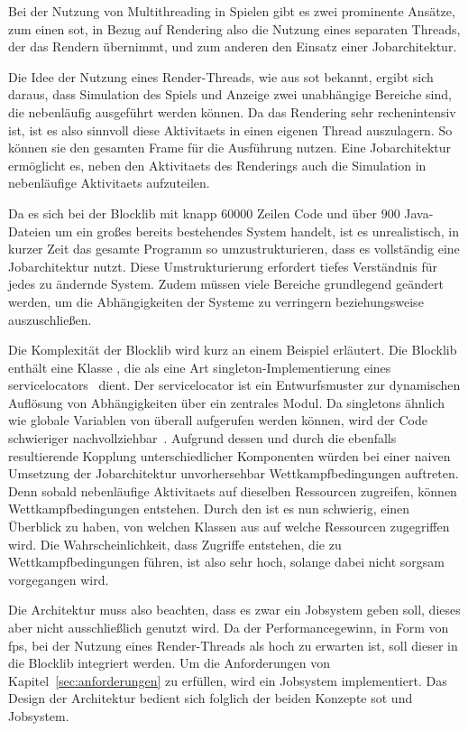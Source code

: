 Bei der Nutzung von Multithreading in Spielen gibt es zwei prominente Ansätze, zum einen \ac{sot}, in Bezug auf Rendering also die Nutzung eines separaten Threads, der das Rendern übernimmt, und zum anderen den Einsatz einer Jobarchitektur.

Die Idee der Nutzung eines Render-Threads, wie aus \ac{sot} bekannt, ergibt sich daraus, dass Simulation des Spiels und Anzeige zwei unabhängige Bereiche sind, die nebenläufig ausgeführt werden können. Da das Rendering sehr rechenintensiv ist, ist es also sinnvoll diese \glspl{Aktivitaet} in einen eigenen Thread auszulagern. So können sie den gesamten Frame für die Ausführung nutzen. Eine Jobarchitektur ermöglicht es, neben den \glspl{Aktivitaet} des Renderings auch die Simulation in nebenläufige \glspl{Aktivitaet} aufzuteilen. 

Da es sich bei der Blocklib mit knapp $60000$ Zeilen Code und über $900$ Java-Dateien um ein großes bereits bestehendes System handelt, ist es unrealistisch, in kurzer Zeit das gesamte \gls{Programm} so umzustrukturieren, dass es vollständig eine Jobarchitektur nutzt. Diese Umstrukturierung erfordert tiefes Verständnis für jedes zu ändernde System. Zudem müssen viele Bereiche grundlegend geändert werden, um die Abhängigkeiten der Systeme zu verringern beziehungsweise auszuschließen.

Die Komplexität der Blocklib wird kurz an einem Beispiel erläutert. Die Blocklib enthält eine Klasse \classContext{}, die als eine Art \gls{singleton}-Implementierung eines \glspl{servicelocator}~\cite[S.~301~\psqq]{Nystrom2015} dient. Der \gls{servicelocator} ist ein Entwurfsmuster zur dynamischen Auflösung von Abhängigkeiten über ein zentrales Modul. Da \glspl{singleton} ähnlich wie globale Variablen von überall aufgerufen werden können, wird der Code  schwieriger nachvollziehbar~\cite[S.~108]{Nystrom2015}.
Aufgrund dessen und durch die ebenfalls resultierende Kopplung unterschiedlicher Komponenten würden bei einer naiven Umsetzung der Jobarchitektur unvorhersehbar Wettkampfbedingungen auftreten.
Denn sobald nebenläufige \glspl{Aktivitaet} auf dieselben Ressourcen zugreifen, können Wettkampfbedingungen entstehen. Durch den \classContext{} ist es nun schwierig, einen Überblick zu haben, von welchen Klassen aus auf welche Ressourcen zugegriffen wird. Die Wahrscheinlichkeit, dass Zugriffe entstehen, die zu Wettkampfbedingungen führen, ist also sehr hoch, solange dabei nicht sorgsam vorgegangen wird.

Die Architektur muss also beachten, dass es zwar ein Jobsystem geben soll, dieses aber nicht ausschließlich genutzt wird. Da der Performancegewinn, in Form von \ac{fps}, bei der Nutzung eines Render-Threads als hoch zu erwarten ist, soll dieser in die Blocklib integriert werden. Um die Anforderungen von Kapitel~\ref{sec:anforderungen} zu erfüllen, wird ein Jobsystem implementiert. Das Design der Architektur bedient sich folglich der beiden Konzepte \ac{sot} und Jobsystem.